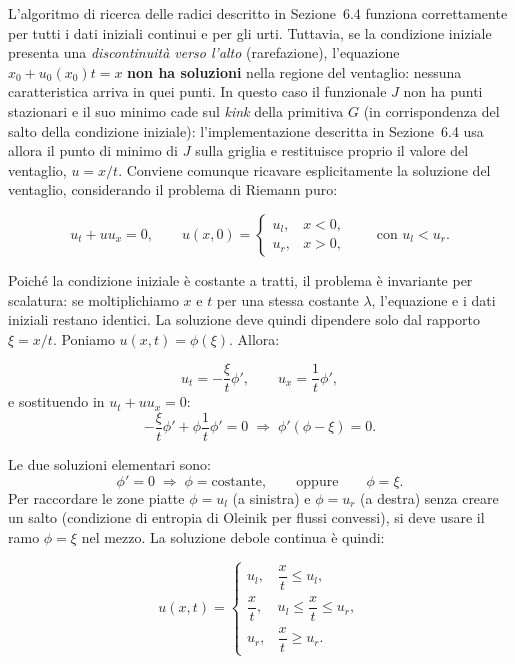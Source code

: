 \documentclass[12pt]{article}
\begin{document}
L'algoritmo di ricerca delle radici descritto in Sezione~6.4 funziona correttamente per tutti i dati iniziali continui e per gli urti. Tuttavia, se la condizione iniziale presenta una \emph{discontinuità verso l'alto} (rarefazione), l'equazione \(x_0+u_0(x_0)t=x\) \textbf{non ha soluzioni} nella regione del ventaglio: nessuna caratteristica arriva in quei punti. In questo caso il funzionale $J$ non ha punti stazionari e il suo minimo cade sul \emph{kink} della primitiva $G$ (in corrispondenza del salto della condizione iniziale): l'implementazione descritta in Sezione~6.4 usa allora il punto di minimo di $J$ sulla griglia e restituisce proprio il valore del ventaglio, $u=x/t$. Conviene comunque ricavare esplicitamente la soluzione del ventaglio, considerando il problema di Riemann puro:

\[
u_t + u u_x = 0, \qquad 
u(x,0)=
\begin{cases}
u_l, & x<0,\\
u_r, & x>0,
\end{cases}
\qquad \text{con } u_l<u_r.
\]

Poiché la condizione iniziale è costante a tratti, il problema è invariante per scalatura: se moltiplichiamo \(x\) e \(t\) per una stessa costante \(\lambda\), l'equazione e i dati iniziali restano identici. La soluzione deve quindi dipendere solo dal rapporto \(\xi=x/t\). Poniamo \(u(x,t)=\phi(\xi)\). Allora:

\[
u_t = -\frac{\xi}{t}\phi', \qquad u_x = \frac{1}{t}\phi',
\]
e sostituendo in \(u_t+u u_x=0\):
\[
-\frac{\xi}{t}\phi' + \phi\frac{1}{t}\phi' = 0
\;\Longrightarrow\; \phi'(\phi-\xi)=0.
\]

Le due soluzioni elementari sono:
\[
\phi' = 0 \;\Longrightarrow\; \phi=\text{costante}, \qquad \text{oppure} \qquad \phi=\xi.
\]
Per raccordare le zone piatte \(\phi=u_l\) (a sinistra) e \(\phi=u_r\) (a destra) senza creare un salto (condizione di entropia di Oleinik per flussi convessi), si deve usare il ramo \(\phi=\xi\) nel mezzo. La soluzione debole continua è quindi:

\[
u(x,t) = 
\begin{cases}
u_l, & \dfrac{x}{t} \le u_l, \\[6pt]
\dfrac{x}{t}, & u_l \le \dfrac{x}{t} \le u_r, \\[6pt]
u_r, & \dfrac{x}{t} \ge u_r.
\end{cases}
\tag{*}
\]
\end{document}
